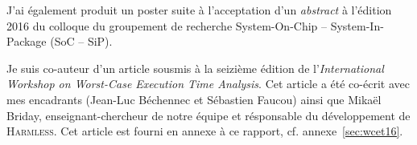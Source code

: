     J'ai également produit un poster suite à l'acceptation d'un \emph{abstract}
    à l'édition 2016 du colloque du groupement de recherche System-On-Chip --
    System-In-Package (SoC -- SiP).
    
    Je suis co-auteur d'un article sousmis à la seizième édition de
    l'\emph{International Workshop on Worst-Case Execution Time Analysis}. Cet
    article a été co-écrit avec mes encadrants (Jean-Luc Béchennec et Sébastien
    Faucou) ainsi que Mikaël Briday, enseignant-chercheur de notre équipe et
    résponsable du développement de \textsc{Harmless}. Cet article est fourni
    en annexe à ce rapport, cf. annexe~\ref{sec:wcet16}.

